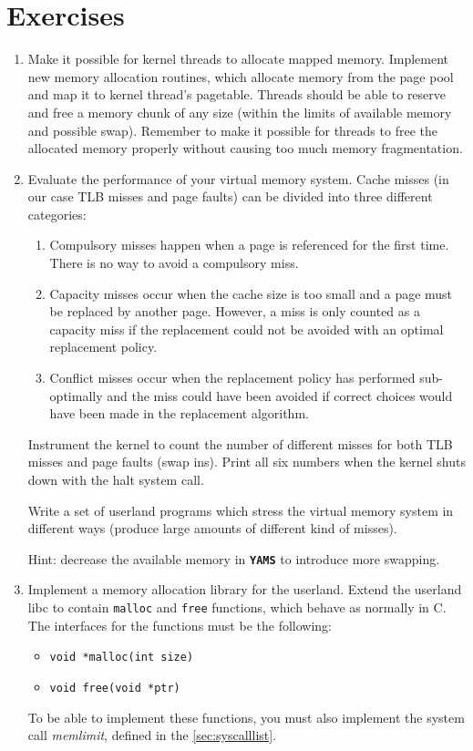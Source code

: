 \documentclass[twoside,a4paper]{report}
\newcommand{\yams}{\texttt{\textbf{YAMS}}}
\newenvironment{exercises}[1][\addcontentsline{toc}{section}{Exercises}%
\section*{Exercises}\markright{EXERCISES}]{%
#1%
\begin{enumerate}%
}{%
\end{enumerate}
}
\newcounter{exercisec}[chapter]
\newcommand{\cexercise}[1]{%
\item[\stepcounter{exercisec}{\huge\Keyboard}\hspace{5mm}\textbf{\arabic{chapter}.\theexercisec{}.}] #1%
}
\begin{document}
\begin{exercises}
\cexercise{Make it possible for kernel threads to allocate mapped
memory. Implement new memory allocation routines, which allocate
memory from the page pool and map it to kernel thread's pagetable. Threads
should be able to reserve and free a memory chunk of any size (within
the limits of available memory and possible swap). Remember to make it
possible for threads to free the allocated memory properly without
causing too much memory fragmentation.}

\cexercise{Evaluate the performance of your virtual memory system.
Cache misses (in our case TLB misses and page faults) can be divided
into three different categories:

\begin{enumerate}
\item Compulsory misses happen when a page is referenced for the first
time. There is no way to avoid a compulsory miss.
\item Capacity misses occur when the cache size is too small and a
page must be replaced by another page. However, a miss is only counted
as a capacity miss if the replacement could not be avoided with an
optimal replacement policy.
\item Conflict misses occur when the replacement policy has performed
sub-optimally and the miss could have been avoided if correct choices
would have been made in the replacement algorithm.
\end{enumerate}

Instrument the kernel to count the number of different misses for both
TLB misses and page faults (swap ins). Print all six numbers when
the kernel shuts down with the halt system call.

Write a set of userland programs which stress the virtual memory
system in different ways (produce large amounts of different kind of
misses). 

Hint: decrease the available memory in \yams{} to introduce more swapping.}

\cexercise{Implement a memory allocation library for the userland.
Extend the userland libc to contain \texttt{malloc} and \texttt{free}
functions, which behave as normally in C. The interfaces for the
functions must be the following:

\begin{itemize}
\item \texttt{void *malloc(int size)}
\item \texttt{void free(void *ptr)}
\end{itemize}

To be able to implement these functions, you must also implement the
system call \emph{memlimit}, defined in the \autoref{sec:syscalllist}.}

\end{exercises}
\end{document}

